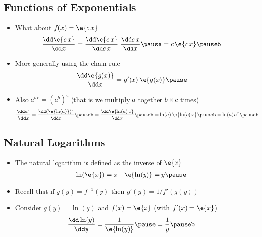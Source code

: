 
\begin{slide}
\section[-1]{Functions of Exponentials}

\begin{PauseHighLight}
  \begin{itemize}
  \item What about $f(x)= \e{c\,x}$
    \begin{align*}
      \frac{\dd \e{c\,x}}{\dd x} = \frac{\dd \e{c\,x}}{\dd c\,x} \;
      \frac{\dd c\,x}{\dd x} \pause=   c \, \e{c\,x}\pauseb
    \end{align*}
  \item More generally using the chain rule
    \begin{align*}
       \frac{\dd \e{g(x)}}{\dd x} = g'(x)\,\e{g(x)}\pause
    \end{align*}
  \item Also $a^{b\,c} = (a^b)^c$ (that is we multiply $a$
    together $b\times c$ times)\pauseb
    \begin{align*}
      \frac{\dd a^x}{\dd x} = \frac{\dd (\e{\ln(a)})^x }{\dd x}\pauseb =
      \frac{\dd \e{\ln(a)\, x}}{\dd x}\pauseb = \ln(a)\,  \e{\ln(a)\, x}\pauseb =
      \ln(a)\, a^x\pauseb
    \end{align*}
  \end{itemize}
\end{PauseHighLight}

\end{slide}


\begin{slide}
\section{Natural Logarithms}

\begin{PauseHighLight}
  \begin{itemize}
  \item The natural logarithm is defined as the inverse of $\e{x}$
    \begin{align*}
      \ln(\e{x}) &= x  & \e{\ln(y)} =y\pause
    \end{align*}
  \item Recall that if $g(y)= f^{-1}(y)$ then $g'(y) =
    1/f'(g(y))$\pause
  \item Consider $g(y)=\ln(y)$ and $f(x)= \e{x}$ (with $f'(x)=\e{x}$)
    \begin{align*}
      \frac{\dd \ln(y)}{\dd y} = \frac{1}{\e{\ln(y)}}\pause = \frac{1}{y}\pauseb
    \end{align*}
   \end{itemize}
\end{PauseHighLight}

\end{slide}

